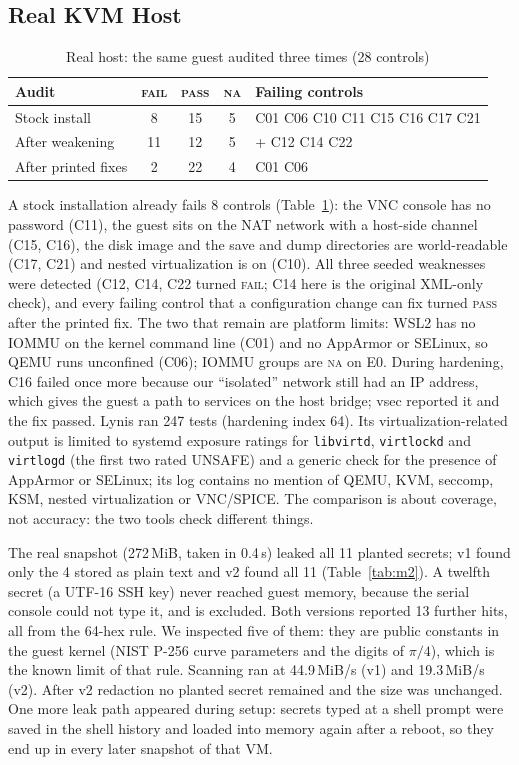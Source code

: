 \documentclass[conference]{IEEEtran}
\newcommand{\pass}{\textsc{pass}}
\newcommand{\fail}{\textsc{fail}}
\newcommand{\na}{\textsc{na}}
\begin{document}
\subsection{Real KVM Host}\label{sec:real}
\begin{table}[!t]
\caption{Real host: the same guest audited three times (28 controls)}
\label{tab:real}
\centering\footnotesize
\begin{tabular}{@{}lcccp{2.5cm}@{}}
\toprule
Audit & \fail & \pass & \na & Failing controls \\
\midrule
Stock install & 8 & 15 & 5 & C01 C06 C10 C11 C15 C16 C17 C21 \\
After weakening & 11 & 12 & 5 & + C12 C14 C22 \\
After printed fixes & 2 & 22 & 4 & C01 C06 \\
\bottomrule
\end{tabular}
\end{table}
A stock installation already fails 8 controls (Table~\ref{tab:real}): the VNC console has no password (C11), the guest sits on the NAT network with a host-side channel (C15, C16), the disk image and the save and dump directories are world-readable (C17, C21) and nested virtualization is on (C10). All three seeded weaknesses were detected (C12, C14, C22 turned \fail; C14 here is the original XML-only check), and every failing control that a configuration change can fix turned \pass{} after the printed fix. The two that remain are platform limits: WSL2 has no IOMMU on the kernel command line (C01) and no AppArmor or SELinux, so QEMU runs unconfined (C06); IOMMU groups are \na{} on E0. During hardening, C16 failed once more because our ``isolated'' network still had an IP address, which gives the guest a path to services on the host bridge; vsec reported it and the fix passed. Lynis ran 247 tests (hardening index 64). Its virtualization-related output is limited to systemd exposure ratings for \texttt{libvirtd}, \texttt{virtlockd} and \texttt{virtlogd} (the first two rated UNSAFE) and a generic check for the presence of AppArmor or SELinux; its log contains no mention of QEMU, KVM, seccomp, KSM, nested virtualization or VNC/SPICE. The comparison is about coverage, not accuracy: the two tools check different things.

The real snapshot (272\,MiB, taken in 0.4\,s) leaked all 11 planted secrets; v1 found only the 4 stored as plain text and v2 found all 11 (Table~\ref{tab:m2}). A twelfth secret (a UTF-16 SSH key) never reached guest memory, because the serial console could not type it, and is excluded. Both versions reported 13 further hits, all from the 64-hex rule. We inspected five of them: they are public constants in the guest kernel (NIST P-256 curve parameters and the digits of $\pi/4$), which is the known limit of that rule. Scanning ran at 44.9\,MiB/s (v1) and 19.3\,MiB/s (v2). After v2 redaction no planted secret remained and the size was unchanged. One more leak path appeared during setup: secrets typed at a shell prompt were saved in the shell history and loaded into memory again after a reboot, so they end up in every later snapshot of that VM.
\end{document}
